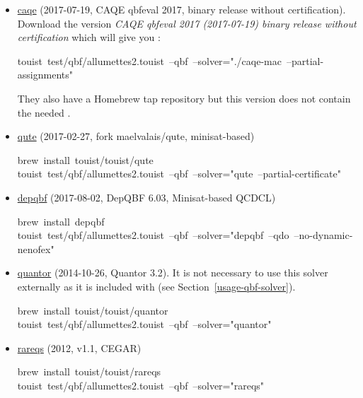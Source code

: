 \begin{itemize}%

\item{}
\href{https://www.react.uni-saarland.de/tools/caqe/index.html}{caqe} (2017-07-19, CAQE qbfeval 2017, binary release without certification).
Download the version \emph{CAQE qbfeval 2017 (2017-07-19) binary release without certification}
which will give you :%
\begin{mdpre}%
\noindent touist~test/qbf/allumettes2.touist~--qbf~--solver="./caqe-mac~--partial-assignments"%
\end{mdpre}
They also have a Homebrew tap repository but this version does not contain
the needed .%

\item{}
\href{https://github.com/perebor/qute}{qute} (2017-02-27, fork maelvalais/qute, minisat-based)%
\begin{mdpre}%
\noindent brew~install~touist/touist/qute\\
touist~test/qbf/allumettes2.touist~--qbf~--solver="qute~--partial-certificate"%
\end{mdpre}%

\item{}
\href{http://lonsing.github.io/depqbf/}{depqbf} (2017-08-02, DepQBF 6.03, Minisat-based QCDCL)%
\begin{mdpre}%
\noindent brew~install~depqbf\\
touist~test/qbf/allumettes2.touist~--qbf~--solver="depqbf~--qdo~--no-dynamic-nenofex"%
\end{mdpre}%

\item{}
\href{http://fmv.jku.at/quantor/}{quantor} (2014-10-26, Quantor 3.2). It is not necessary to use this
solver externally as it is included with  (see Section~\ref{usage-qbf-solver}).%
\begin{mdpre}%
\noindent brew~install~touist/touist/quantor\\
touist~test/qbf/allumettes2.touist~--qbf~--solver="quantor"%
\end{mdpre}%

\item{}
\href{http://sat.inesc-id.pt/~mikolas/sw/areqs/}{rareqs} (2012, v1.1, CEGAR)%
\begin{mdpre}%
\noindent brew~install~touist/touist/rareqs\\
touist~test/qbf/allumettes2.touist~--qbf~--solver="rareqs"%
\end{mdpre}%
\end{itemize}%


